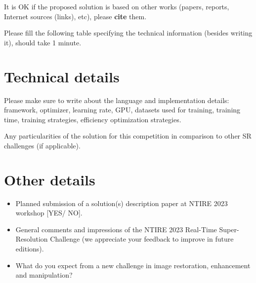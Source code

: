 \documentclass{article}
\begin{document}
It is OK if the proposed solution is based on other works (papers, reports, Internet sources (links), etc), please \textbf{cite} them.

\vspace{4mm}
Please fill the following table specifying the technical information (besides writing it), should take 1 minute. 

\begin{table}[]
    \centering
    \caption{FILL THIS TABLE PLEASE}
    \label{tab:my_label}
\end{table}

\section{Technical details}
Please make sure to write about the language and implementation details: framework, optimizer, learning rate, GPU, datasets used for training, training time, training strategies, efficiency optimization strategies.

\vspace{4mm}
\noindent Any particularities of the solution for this competition in comparison to other SR challenges (if applicable).

\section{Other details}
\begin{itemize}

\item Planned submission of a solution(s) description paper at NTIRE 2023 workshop [YES/ NO].

\item General comments and impressions of the NTIRE 2023 Real-Time Super-Resolution Challenge (we appreciate your feedback to improve in future editions).

\item What do you expect from a new challenge in image restoration, enhancement and manipulation?

\end{itemize}
\end{document}
